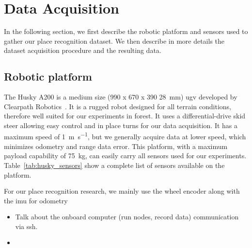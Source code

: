 \section{Data Acquisition}
\label{sec:chap_slam_data_acquisition}

In the following section, we first describe the robotic platform and sensors used to gather our place recognition dataset. We then describe in more details the dataset acquisition procedure and the resulting data.


\subsection{Robotic platform}
\label{ssec:chap_slam_platform}

The Husky A200 is a medium size (990 x 670 x 390 \SI{28}{\milli\meter}) \gls{ugv} developed by Clearpath Robotics~\cite{ClearpathWeb}. It is a rugged robot designed for all terrain conditions, therefore well suited for our experiments in forest. It uses a differential-drive skid steer allowing easy control and in place turns for our data acquisition. It has a maximum speed of \SI{1}{\meter\per\second}, but we generally acquire data at lower speed, which minimizes odometry and range data error. This platform, with a maximum payload capability of \SI{75}{\kilo\gram}, can easily carry all sensors used for our experiments. Table~\ref{tab:husky_sensors} show a complete list of sensors available on the platform.

For our place recognition research, we mainly use the wheel encoder along with the \gls{imu} for odometry
\begin{itemize}
    \item Talk about the onboard computer (run nodes, record data) communication via ssh.
    \item
\end{itemize}

